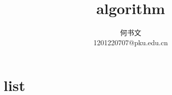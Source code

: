 \documentclass[oneside,12pt,twiside,a4paper]{ctexbook}
\begin{document}
\author
{
何书文\\
1201220707@pku.edu.cn\\
}

\title{algorithm}
\maketitle
\tableofcontents


\chapter{list}
\end{document}
